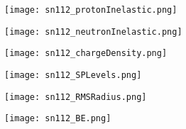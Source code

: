 \documentclass[twocolumn,secnumarabic,amssymb, nobibnotes, aps, prl,
superscriptaddress, nobalancelastpage, floatfix]{revtex4}
\newcommand{\snTwelve}{\ensuremath{^{112}}S\lowercase{n}}
\begin{document}
{\begin{figure*}[!htb]
    \centering
    \begin{minipage}{0.4\linewidth}
        \centering
        \texttt{[image: sn112\_protonInelastic.png]}
        \label{DOM_sn112_proton_inelastic}
    \end{minipage}\hspace{6pt}
    \begin{minipage}{0.4\linewidth}
        \centering
        \texttt{[image: sn112\_neutronInelastic.png]}
        \label{DOM_sn112_neutron_inelastic}
    \end{minipage}
    \centering
    \begin{minipage}{0.4\linewidth}
        \centering
        \texttt{[image: sn112\_chargeDensity.png]}
        \label{DOM_sn112_chargeDensity}
    \end{minipage}\hspace{6pt}
    \begin{minipage}{0.4\linewidth}
        \centering
        \texttt{[image: sn112\_SPLevels.png]}
        \label{DOM_sn112_SPLevels}
    \end{minipage}
    \begin{minipage}{0.4\linewidth}
        \centering
        \texttt{[image: sn112\_RMSRadius.png]}
        \label{DOM_sn112_RMSRadius}
    \end{minipage}\hspace{6pt}
    \begin{minipage}{0.4\linewidth}
        \centering
        \texttt{[image: sn112\_BE.png]}
        \label{DOM_sn112_BE}
    \end{minipage}
    \caption{\snTwelve: constraining experimental data and DOM fit. See introduction of
    Appendix C for description.}
    \label{DOM_sn112}
\end{figure*}

}
\end{document}
